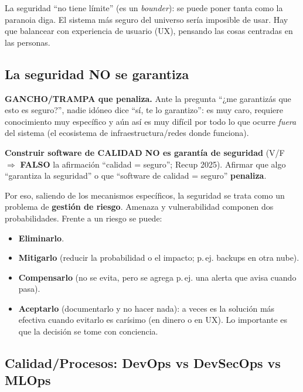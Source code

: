 \documentclass[../main.tex]{subfiles}
\begin{document}
\begin{ojo}
La seguridad ``no tiene límite'' (es un \emph{bounder}): se puede poner tanta como la paranoia diga. El sistema más seguro del universo sería imposible de usar. Hay que balancear con experiencia de usuario (UX), pensando las cosas centradas en las personas.
\end{ojo}

\subsection{La seguridad NO se garantiza}

\begin{ojo}
\textbf{GANCHO/TRAMPA que penaliza.}  Ante la pregunta ``¿me garantizás que esto es seguro?'', nadie idóneo dice ``sí, te lo garantizo'': es muy caro, requiere conocimiento muy específico y aún así es muy difícil por todo lo que ocurre \emph{fuera} del sistema (el ecosistema de infraestructura/redes donde funciona).

\textbf{Construir software de CALIDAD NO es garantía de seguridad} (V/F $\Rightarrow$ \textbf{FALSO} la afirmación ``calidad = seguro''; Recup 2025). Afirmar que algo ``garantiza la seguridad'' o que ``software de calidad = seguro'' \textbf{penaliza}.
\end{ojo}

Por eso, saliendo de los mecanismos específicos, la seguridad se trata como un problema de \textbf{gestión de riesgo}. Amenaza y vulnerabilidad componen dos probabilidades. Frente a un riesgo se puede:
\begin{itemize}
  \item \textbf{Eliminarlo}.
  \item \textbf{Mitigarlo} (reducir la probabilidad o el impacto; p.\,ej. backups en otra nube).
  \item \textbf{Compensarlo} (no se evita, pero se agrega p.\,ej. una alerta que avisa cuando pasa).
  \item \textbf{Aceptarlo} (documentarlo y no hacer nada): a veces es la solución más efectiva cuando evitarlo es carísimo (en dinero o en UX). Lo importante es que la decisión se tome con conciencia.
\end{itemize}

\subsection{Calidad/Procesos: DevOps vs DevSecOps vs MLOps}
\end{document}
